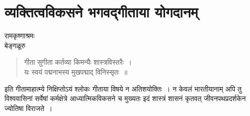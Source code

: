 {\fontsize{15}{17}\selectfont
\chapter{व्यक्तित्वविकसने भगवद्गीताया योगदानम्}

\begin{center}
\smallskip
रामकृष्णाश्रमः\\
बेङ्गळूरु
\addrule
\end{center}

\begin{verse}
गीता सुगीता कर्तव्या किमन्यैः शास्त्रविस्तरैः~। \\
यः स्वयं पद्मनाभस्य मुखपद्माद् विनिस्सृतः~॥
\end{verse}
इति गीतामाहात्म्ये निक्षिप्तोऽयं श्लोकः गीताया विषये न अतिशयोक्तिः~। न केवलं भारतीयानाम् अपि तु विश्ववासिनां सर्वेषां कर्मक्षेत्रे आध्यात्मिकविकसने च मुख्यतः इदं शास्त्रं शासनं कृतवत् जीवनपथप्रदर्शकेन ज्योतिषा विराजते~। 

}
